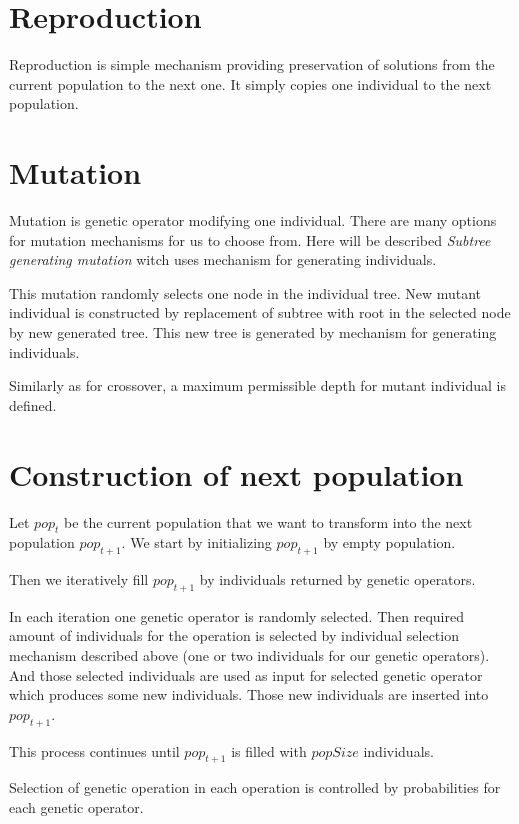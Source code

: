 \documentclass[12pt,a4paper]{report}
\begin{document}
\section{Reproduction}

Reproduction is simple mechanism providing preservation of solutions
from the current population to the next one. It simply copies 
one individual to the next population.

\section{Mutation}

Mutation is genetic operator modifying one individual.
There are many options for mutation mechanisms 
for us to choose from. Here will be described 
\textit{Subtree generating mutation} 
witch uses mechanism for generating individuals.

This mutation randomly selects one node in the individual tree.
New mutant individual is constructed by replacement of 
subtree with root in the selected node by new generated
tree. This new tree is generated by mechanism for generating 
individuals.

Similarly as for crossover, a maximum permissible depth for mutant individual 
is defined.


\section{Construction of next population}

Let $pop_{t}$ be the current population that we want to 
transform into the next population $pop_{t+1}$. 
We start by initializing $pop_{t+1}$ by empty population.

Then we iteratively fill $pop_{t+1}$ by individuals 
returned by genetic operators.

In each iteration one genetic operator is randomly selected.
Then required amount of individuals for the operation is selected
by individual selection mechanism described above (one or two
individuals for our genetic operators).
And those selected individuals are used as input for selected
genetic operator which produces some new individuals.
Those new individuals are inserted into $pop_{t+1}$.

This process continues until $pop_{t+1}$ is filled with
$popSize$ individuals.  

Selection of genetic operation in each operation is 
controlled by probabilities for each genetic operator.\\
\end{document}
